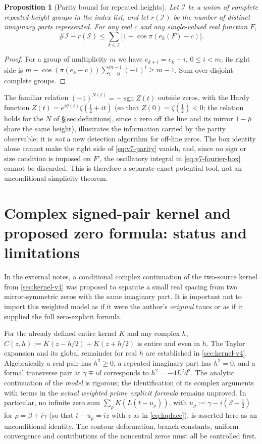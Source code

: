\documentclass[11pt,a4paper]{article}
\numberwithin{equation}{section}
\newtheorem{proposition}[theorem]{Proposition}
\theoremstyle{definition}
\theoremstyle{remark}
\begin{document}
\begin{proposition}[Parity bound for repeated heights]
\label{prop:v7-parity}
Let $\mathcal I$ be a union of complete repeated-height
groups in the index list, and let $r(\mathcal I)$ be the number
of distinct imaginary parts represented. For any real $c$
and any single-valued real function $F$,
\begin{equation}\label{eq:v7-parity}
\#\mathcal I-r(\mathcal I)
\le\sum_{k\in\mathcal I}
  \bigl[1-\cos\pi(e_k(F)-c)\bigr].
\end{equation}
\end{proposition}
\begin{proof}
For a group of multiplicity $m$ we have
$e_{k+i}=e_k+i$, $0\le i<m$; its right side is
$m-\cos(\pi(e_k-c))\sum_{i=0}^{m-1}(-1)^i\ge m-1$.
Sum over disjoint complete groups.
\end{proof}

The familiar relation $(-1)^{N(t)}=-\operatorname{sgn}Z(t)$
outside zeros, with the Hardy function $Z(t)=e^{i\vartheta(t)}\zeta(\frac12+it)$ (so that $Z(0)=\zeta(\frac12)<0$; the relation holds for the $N$ of \S\ref{sec:definitions}, since a zero off the line and its mirror $1-\bar\rho$ share the same height), illustrates the information carried by the parity
observable; it is \emph{not} a new detection algorithm for
off-line zeros. The box identity alone cannot make the
right side of \eqref{eq:v7-parity} vanish, and, since no sign or size
condition is imposed on $F'$, the oscillatory integral in
\eqref{eq:v7-fourier-box} cannot be discarded. This is therefore a separate exact
potential tool, not an unconditional simplicity theorem.

\section{Complex signed-pair kernel and proposed zero formula:
       status and limitations}\label{sec:v7-complex}
In the external notes, a conditional complex continuation of the
two-source kernel from \cref{sec:kernel-v4} was proposed to
separate a small real spacing from two mirror-symmetric
zeros with the same imaginary part. It is important not to import
this weighted model as if it were the author's \emph{original}
taucs or as if it supplied the full zero-explicit formula.

For the already defined entire kernel $K$ and any complex $h$,
$C(z,h):=K(z-h/2)+K(z+h/2)$ is entire and even in $h$.
The Taylor expansion and its global remainder for real $h$
are established in \cref{sec:kernel-v4}. Algebraically a
real pair has $h^2\ge0$, a repeated imaginary part has $h^2=0$,
and a formal transverse pair at $\gamma\mp id$ corresponds
to $h^2=-4L^2d^2$. The analytic continuation of the
\emph{model} is rigorous; the identification of its complex
arguments with terms in the \emph{actual weighted prime
explicit formula} remains unproved. In particular, no
infinite zero sum $\sum_\rho K(L(t-u_\rho))$, with $u_\rho:=\gamma-i(\beta-\frac12)$ for $\rho=\beta+i\gamma$ (so that $t-u_\rho=iz$ with $z$ as in \eqref{eq:laplace}), is asserted
here as an unconditional identity. The contour deformation,
branch constants, uniform convergence and contributions of
the noncentral zeros must all be controlled first.
\end{document}
